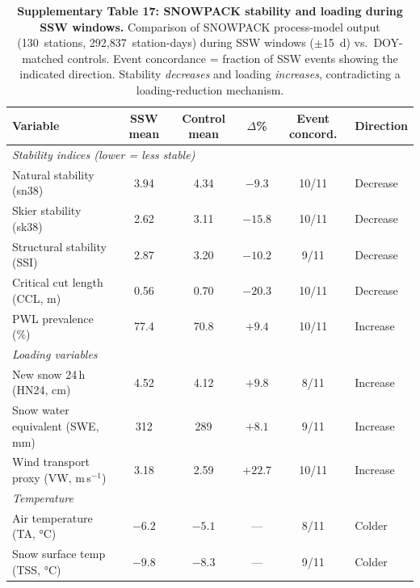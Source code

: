 \begin{table}[!ht]
\centering
\caption{\textbf{Supplementary Table 17: SNOWPACK stability and loading during SSW windows.}
Comparison of SNOWPACK process-model output (130~stations, 292,837~station-days) during SSW windows ($\pm$15~d) vs.\ DOY-matched controls. Event concordance = fraction of SSW events showing the indicated direction. Stability \emph{decreases} and loading \emph{increases}, contradicting a loading-reduction mechanism.}
\label{tab:snowpack}
\small
\begin{tabular}{lccccl}
\toprule
Variable & SSW mean & Control mean & $\Delta$\% & Event concord. & Direction \\
\midrule
\multicolumn{6}{l}{\textit{Stability indices (lower = less stable)}} \\
Natural stability (sn38) & 3.94 & 4.34 & $-9.3$ & 10/11 & Decrease \\
Skier stability (sk38) & 2.62 & 3.11 & $-15.8$ & 10/11 & Decrease \\
Structural stability (SSI) & 2.87 & 3.20 & $-10.2$ & 9/11 & Decrease \\
Critical cut length (CCL, m) & 0.56 & 0.70 & $-20.3$ & 10/11 & Decrease \\
PWL prevalence (\%) & 77.4 & 70.8 & $+9.4$ & 10/11 & Increase \\
\midrule
\multicolumn{6}{l}{\textit{Loading variables}} \\
New snow 24\,h (HN24, cm) & 4.52 & 4.12 & $+9.8$ & 8/11 & Increase \\
Snow water equivalent (SWE, mm) & 312 & 289 & $+8.1$ & 9/11 & Increase \\
Wind transport proxy (VW, m\,s$^{-1}$) & 3.18 & 2.59 & $+22.7$ & 10/11 & Increase \\
\midrule
\multicolumn{6}{l}{\textit{Temperature}} \\
Air temperature (TA, °C) & $-6.2$ & $-5.1$ & --- & 8/11 & Colder \\
Snow surface temp (TSS, °C) & $-9.8$ & $-8.3$ & --- & 9/11 & Colder \\
\bottomrule
\end{tabular}
\end{table}

